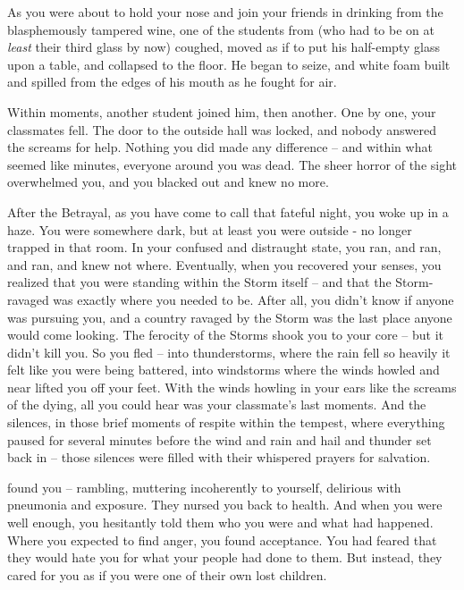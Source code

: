 \documentclass[char]{GL2020}
\begin{document}
As you were about to hold your nose and join your friends in drinking from the blasphemously tampered wine, one of the students from \pFarm{} (who had to be on at \emph{least} their third glass by now) coughed, moved as if to put his half-empty glass upon a table, and collapsed to the floor. He began to seize, and white foam built and spilled from the edges of his mouth as he fought for air.  

Within moments, another student joined him, then another. One by one, your classmates fell.  The door to the outside hall was locked, and nobody answered the screams for help.  Nothing you did made any difference -- and within what seemed like minutes, everyone around you was dead. The sheer horror of the sight overwhelmed you, and you blacked out and knew no more.

After the Betrayal, as you have come to call that fateful night, you woke up in a haze. You were somewhere dark, but at least you were outside - no longer trapped in that room. In your confused and distraught state, you ran, and ran, and ran, and knew not where. Eventually, when you recovered your senses, you realized that you were standing within the Storm itself -- and that the Storm-ravaged \pShip{} was exactly where you needed to be. After all, you didn’t know if anyone was pursuing you, and a country ravaged by the Storm was the last place anyone would come looking. The ferocity of the Storms shook you to your core -- but it didn’t kill you. So you fled -- into thunderstorms, where the rain fell so heavily it felt like you were being battered, into windstorms where the winds howled and near lifted you off your feet. With the winds howling in your ears like the screams of the dying, all you could hear was your classmate’s last moments. And the silences, in those brief moments of respite within the tempest, where everything paused for several minutes before the wind and rain and hail and thunder set back in -- those silences were filled with their whispered prayers for salvation.

\cSaviourFleet{} found you -- rambling, muttering incoherently to yourself, delirious with pneumonia and exposure. They nursed you back to health. And when you were well enough, you hesitantly told them who you were and what had happened. Where you expected to find anger, you found acceptance. You had feared that they would hate you for what your people had done to them. But instead, they cared for you as if you were one of their own lost children.
\end{document}
